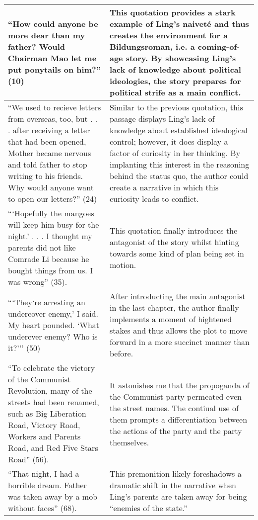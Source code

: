 \documentclass[12pt]{article}
\begin{document}
\begin{longtable}{| p{} | p{} |}
  \hline
  ``How could anyone be more dear than my father? Would Chairman Mao let me put ponytails on him?'' (10) & This quotation provides a stark example of Ling's naiveté and thus creates the environment for a Bildungsroman, i.e. a coming-of-age story. By showcasing Ling's lack of knowledge about political ideologies, the story prepares for political strife as a main conflict.  \\
  \hline
  ``We used to recieve letters from overseas, too, but . . . after receiving a letter that had been opened, Mother became nervous and told father to stop writing to his friends. Why would anyone want to open our letters?'' (24) & Similar to the previous quotation, this passage displays Ling's lack of knowledge about established idealogical control; however, it does display a factor of curiosity in her thinking. By implanting this interest in the reasoning behind the status quo, the author could create a narrative in which this curiosity leads to conflict.  \\
  \hline
  ```Hopefully the mangoes will keep him busy for the night.' . . . I thought my parents did not like Comrade Li because he bought things from us. I was wrong'' (35). & This quotation finally introduces the antagonist of the story whilst hinting towards some kind of plan being set in motion. \\
  \hline
  ```They`re arresting an undercover enemy,' I said. My heart pounded. `What undercver enemy? Who is it?''' (50) & After introducting the main antagonist in the last chapter, the author finally implements a moment of hightened stakes and thus allows the plot to move forward in a more succinct manner than before. \\
  \hline
  ``To celebrate the victory of the Communist Revolution, many of the streets had been renamed, such as Big Liberation Road, Victory Road, Workers and Parents Road, and Red Five Stars Road'' (56). & It astonishes me that the propoganda of the Communist party permeated even the street names. The contiual use of them prompts a differentiation between the actions of the party and the party themselves. \\
  \hline
  ``That night, I had a horrible dream. Father was taken away by a mob without faces'' (68). & This premonition likely foreshadows a dramatic shift in the narrative when Ling's parents are taken away for being ``enemies of the state.'' \\
  \hline

\end{longtable}
\end{document}
